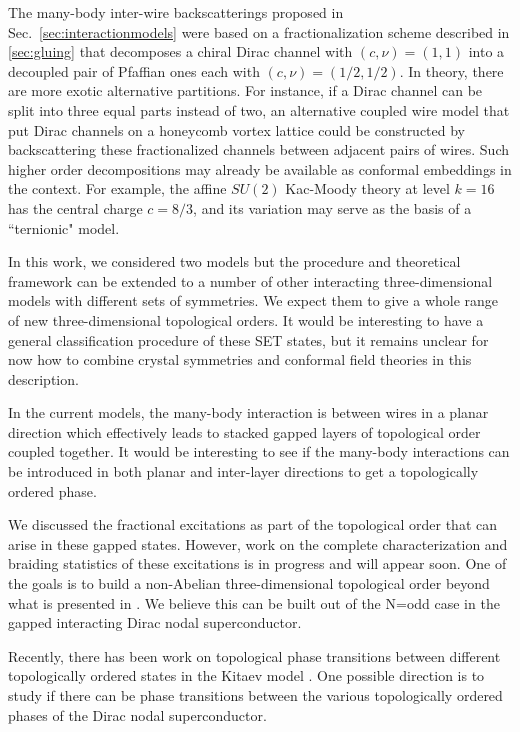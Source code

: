 The many-body inter-wire backscatterings proposed in Sec.~\ref{sec:interactionmodels} were based on a fractionalization scheme described in \ref{sec:gluing} that decomposes a chiral Dirac channel with $(c,\nu)=(1,1)$ into a decoupled pair of Pfaffian ones each with $(c,\nu)=(1/2,1/2)$. In theory, there are more exotic alternative partitions. For instance, if a Dirac channel can be split into three equal parts instead of two, an alternative coupled wire model that put Dirac channels on a honeycomb vortex lattice could be constructed by backscattering these fractionalized channels between adjacent pairs of wires. Such higher order decompositions may already be available as conformal embeddings in the \CFT context. For example, the affine $SU(2)$ Kac-Moody theory at level $k=16$ has the central charge $c=8/3$, and its variation may serve as the basis of a ``ternionic" model.

In this work, we considered two models but the procedure and theoretical framework can be extended to a number of other interacting three-dimensional models with different sets of symmetries. We expect them to give a whole range of new three-dimensional topological orders. It would be interesting to have a general classification procedure of these SET states, but it remains unclear for now how to combine crystal symmetries and conformal field theories in this description. 

In the current models, the many-body interaction is between wires in a planar direction which effectively leads to stacked gapped layers of topological order coupled together. It would be interesting to see if the many-body interactions can be introduced in both planar and inter-layer directions to get a topologically ordered phase.  

We discussed the fractional excitations as part of the topological order that can arise in these gapped states. However, work on the complete characterization and braiding statistics of these excitations is in progress and will appear soon. One of the goals is to build a non-Abelian three-dimensional topological order beyond what is presented in \cite{Iadecola2017}. We believe this can be built out of the N=odd case in the gapped interacting Dirac nodal superconductor.

Recently, there has been work on topological phase transitions between different topologically ordered states in the Kitaev model \cite{ZouHe2018}. One possible direction is to study if there can be phase transitions between the various topologically ordered phases of the Dirac nodal superconductor. 

